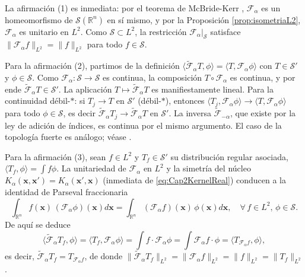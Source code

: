            \begin{Proof}
                La afirmación (1) es inmediata: por el teorema de McBride-Kerr \citep{mcbride1987namias}, $\mathcal{F}_\alpha$ es un homeomorfismo de $\mathcal{S}(\mathbb{R}^n)$ en sí mismo, y por la Proposición \ref{prop:isometriaL2}, $\mathcal{F}_\alpha$ es unitario en $L^2$. Como $\mathcal{S}\subset L^2$, la restricción $\mathcal{F}_\alpha\big|_{\mathcal{S}}$ satisface $\|\mathcal{F}_\alpha f\|_{L^2} = \|f\|_{L^2}$ para todo $f\in \mathcal{S}$.

                Para la afirmación (2), partimos de la definición $\langle \tilde{\mathcal{F}}_\alpha T, \phi\rangle = \langle T, \mathcal{F}_\alpha \phi\rangle$ con $T\in\mathcal{S}'$ y $\phi\in \mathcal{S}$. Como $\mathcal{F}_\alpha: \mathcal{S}\to \mathcal{S}$ es continua, la composición $T\circ \mathcal{F}_\alpha$ es continua, y por ende $\tilde{\mathcal{F}}_\alpha T \in \mathcal{S}'$. La aplicación $T\mapsto \tilde{\mathcal{F}}_\alpha T$ es manifiestamente lineal. Para la continuidad débil-$*$: si $T_j \to T$ en $\mathcal{S}'$ (débil-$*$), entonces $\langle T_j, \mathcal{F}_\alpha \phi\rangle \to \langle T, \mathcal{F}_\alpha \phi\rangle$ para todo $\phi\in\mathcal{S}$, es decir $\tilde{\mathcal{F}}_\alpha T_j \to \tilde{\mathcal{F}}_\alpha T$ en $\mathcal{S}'$. La inversa $\tilde{\mathcal{F}}_{-\alpha}$, que existe por la ley de adición de índices, es continua por el mismo argumento. El caso de la topología fuerte es análogo; véase \citep[Ch. V]{reed1980methods}.

                Para la afirmación (3), sean $f \in L^2$ y $T_f \in \mathcal{S}'$ su distribución regular asociada, $\langle T_f, \phi\rangle = \int f\phi$. La unitariedad de $\mathcal{F}_\alpha$ en $L^2$ y la simetría del núcleo $K_\alpha(\mathbf{x},\mathbf{x}') = K_\alpha(\mathbf{x}',\mathbf{x})$ (inmediata de \eqref{eq:Cap2KernelReal}) conducen a la identidad de Parseval fraccionaria
                \begin{equation}\label{eq:Cap2Parseval}
                    \int_{\mathbb{R}^n}f(\mathbf{x})\,(\mathcal{F}_\alpha \phi)(\mathbf{x}) d\mathbf{x} = \int_{\mathbb{R}^n}(\mathcal{F}_\alpha f)(\mathbf{x})\,\phi(\mathbf{x}) d\mathbf{x},\quad \forall\, f\in L^2,\, \phi\in \mathcal{S}.
                \end{equation}
                De aquí se deduce
                \begin{equation*}
                    \langle \tilde{\mathcal{F}}_\alpha T_f, \phi\rangle = \langle T_f, \mathcal{F}_\alpha \phi\rangle = \int f\cdot \mathcal{F}_\alpha \phi = \int \mathcal{F}_\alpha f \cdot \phi = \langle T_{\mathcal{F}_\alpha f}, \phi\rangle,
                \end{equation*}
                es decir, $\tilde{\mathcal{F}}_\alpha T_f = T_{\mathcal{F}_\alpha f}$, de donde $\|\tilde{\mathcal{F}}_\alpha T_f\|_{L^2} = \|\mathcal{F}_\alpha f\|_{L^2} = \|f\|_{L^2} = \|T_f\|_{L^2}$.
            \end{Proof}

